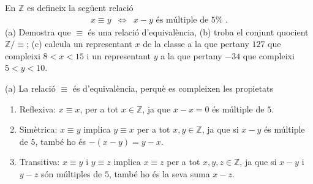 \begin{exercici}
En $\mathbb{Z}$ es defineix la següent relació%
\begin{equation*}
\begin{array}{ccc}
x\equiv y & \Longleftrightarrow & x-y\text{ \ és múltiple de }5\text{%
.}%
\end{array}%
\end{equation*}%
(a) Demostra que $\equiv $ és una relació d'equivalència, (b)
troba el conjunt quocient $\mathbb{Z}/\equiv $; (c) calcula un representant $%
x$ de la classe a la que pertany $127$ que compleixi $8<x<15$ i un
representant $y$ a la que pertany $-34$ que compleixi $5<y<10$.
\end{exercici}

\begin{solucio}
(a) La relació $\equiv $ és d'equivalència, perquè es
compleixen les propietats

\begin{enumerate}
\item Reflexiva: $x\equiv x$, per a tot $x\in \mathbb{Z}$, ja que $x-x=0$
és múltiple de $5$.

\item Simètrica: $x\equiv y$ implica $y\equiv x$ per a tot $x,y\in
\mathbb{Z}$, ja que si $x-y$ és múltiple de $5$, també ho és
$-(x-y)=y-x$.

\item Transitiva: $x\equiv y$ i $y\equiv z$ implica $x\equiv z$ per a tot $%
x,y,z\in \mathbb{Z}$, ja que si $x-y$ i $y-z$ són múltiples de $5$,
també ho és la seva suma $x-z$.
\end{enumerate}


\end{solucio}
